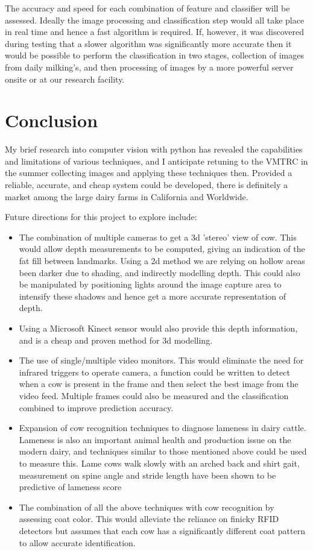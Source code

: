 \documentclass[11pt]{article}
\begin{document}
	The accuracy and speed for each combination of feature and classifier will be assessed.
	Ideally the image processing and classification step would all take place in real time and hence a fast algorithm is required. 
	If, however, it was discovered during testing that a slower algorithm was significantly more accurate then it would be possible to perform the classification in two stages, collection of images from daily milking's, and then processing of images by a more powerful server onsite or at our research facility. 

\newpage
\section{Conclusion}
	My brief research into computer vision with python has revealed the capabilities and limitations of various techniques, and I anticipate retuning to the VMTRC in the summer collecting images and applying these techniques then.
	Provided a reliable, accurate, and cheap system could be developed, there is definitely a market among the large dairy farms in California and Worldwide.

	Future directions for this project to explore include:
	\begin{itemize}
		\item The combination of multiple cameras to get a 3d 'stereo' view of cow. This would allow depth measurements to be computed, giving an indication of the fat fill between landmarks.
			Using a 2d method we are relying on hollow areas been darker due to shading, and indirectly modelling depth.
			This could also be manipulated by positioning lights around the image capture area to intensify these shadows and hence get a more accurate representation of depth.
		\item Using a Microsoft Kinect sensor would also provide this depth information, and is a cheap and proven method for 3d modelling.
		\item The use of single/multiple video monitors. This would eliminate the need for infrared triggers to operate camera, a function could be written to detect when a cow is present in the frame and then select the best image from the video feed. Multiple frames could also be measured and the classification combined to improve prediction accuracy.
		\item Expansion of cow recognition techniques to diagnose lameness in dairy cattle. Lameness is also an important animal health and production issue on the modern dairy, and techniques similar to those mentioned above could be used to measure this.
			Lame cows walk slowly with an arched back and shirt gait, measurement on spine angle and stride length have been shown to be predictive of lameness score\cite{Viazzi2013,Pluk2012}
		\item The combination of all the above techniques with cow recognition by assessing coat color. This would alleviate the reliance on finicky RFID detectors but assumes that each cow has a significantly different coat pattern to allow accurate identification.
	\end{itemize}
\end{document}

